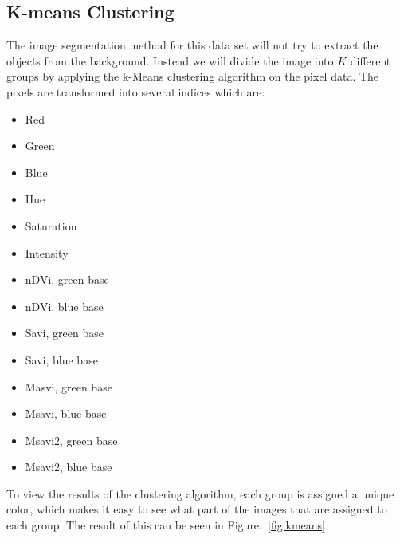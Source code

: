 \subsection{K-means Clustering}

The image segmentation method for this data set will not try to extract the objects from the background. Instead we will divide the image into $K$ different groups by applying the k-Means clustering algorithm on the pixel data. The pixels are transformed into several indices which are:

\begin{itemize}
    \item Red
    \item Green
    \item Blue
    \item Hue
    \item Saturation
    \item Intensity
    \item nDVi, green base
    \item nDVi, blue base
    \item Savi, green base
    \item Savi, blue base
    \item Masvi, green base
    \item Msavi, blue base
    \item Msavi2, green base
    \item Msavi2, blue base
\end{itemize}

To view the results of the clustering algorithm, each group is assigned a unique color, which makes it easy to see what part of the images that are assigned to each group. The result of this can be seen in Figure.~\ref{fig:kmeans}.

